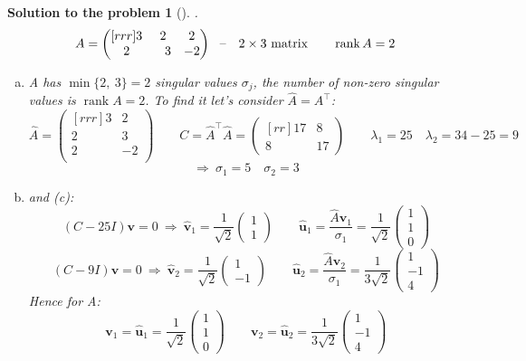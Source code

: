 \documentclass[12pt,a4]{article}
\newtheorem{solution}{Solution to the problem}
\newcommand\rank{\operatorname{rank}}
\newcommand{\bu}{{\mathbf u}}
\newcommand{\bv}{{\mathbf v}}
\begin{document}
\begin{solution}[] \rm .
\[
 A = 
\begin{pmatrix}[rrr]
3 & 2 & 2 \\
2 & \hphantom{-}3 & -2
\end{pmatrix}
~\text{ -- ~ $2\times 3$ matrix}
\qquad
\rank A = 2
\]
\begin{enumerate}[(a)]
	\item A has $\min\{2,~3\} = 2$ singular values $\sigma_j$, the number of non-zero singular values is $\rank A = 2$. To find it let's consider $\hat A=A^\top$:
\[
\hat A =
\begin{pmatrix}[rrr]
3 & 2 \\
2 & 3 \\
2 & -2 \\
\end{pmatrix}
\qquad
C = \hat A^\top \hat A = 
\begin{pmatrix}[rr]
17 & 8 \\
8 & 17
\end{pmatrix}
\qquad
\lambda_1 = 25
\quad
\lambda_2 = 34 - 25 = 9
\]
\[
\Rightarrow ~ 
\sigma_1 = 5
\quad
\sigma_2 = 3
\]
	\item and (c):
\[
(C - 25I)\bv = 0
~\Rightarrow~
\hat \bv_1 = \frac{1}{\sqrt2}
\begin{pmatrix} 1 \\ 1 \end{pmatrix}
\qquad
\hat \bu_1 = \frac{\hat A\bv_1}{\sigma_1} = \frac1{\sqrt2}
\begin{pmatrix} 1 \\ 1 \\ 0 \end{pmatrix} 
\]
\[
(C - 9I)\bv = 0
~\Rightarrow~
\hat \bv_2 = \frac{1}{\sqrt2}
\begin{pmatrix} 1 \\ -1 \end{pmatrix}
\qquad
\hat \bu_2 = \frac{\hat A\bv_2}{\sigma_1} = \frac1{3\sqrt2}
\begin{pmatrix} 1 \\ -1 \\ 4 \end{pmatrix} 
\]
Hence for A:
\[
\bv_1 = \hat \bu_1 = \frac1{\sqrt2}
\begin{pmatrix} 1 \\ 1 \\ 0 \end{pmatrix} 
\qquad
\bv_2 = \hat \bu_2 = \frac1{3\sqrt2}
\begin{pmatrix} 1 \\ -1 \\ 4 \end{pmatrix} 
\]
\end{enumerate}
\end{solution}
\end{document}
